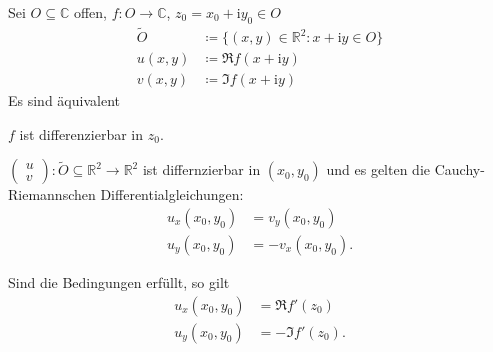 \begin{theorem}[Satz] \label{thm:2.20}
  Sei $O \subseteq \mathbb{C}$ offen, $f : O \to \mathbb{C}$, $z_0 = x_0 + \mathrm{i} y_0 \in O$
  \begin{align*}
    \widetilde{O} &\coloneq \{(x,y) \in \mathbb{R}^2 : x + \mathrm{i} y \in O\} \\
    u(x,y) &\coloneq \Re f(x + \mathrm{i} y) \\
    v(x,y) &\coloneq \Im f(x + \mathrm{i} y)
  \end{align*}
  Es sind äquivalent
  \begin{enum-roman}
    \item \label{itm:2.20 i} $f$ ist differenzierbar in $z_0$.
    
    \item \label{itm:2.20 ii} $\begin{pmatrix} u \\ v \end{pmatrix} : \widetilde{O} \subseteq \mathbb{R}^2 \to \mathbb{R}^2$ ist differnzierbar in $(x_0,y_0)$ und es gelten die Cauchy-Riemannschen Differentialgleichungen:
    \begin{align*}
      u_x(x_0,y_0) &= v_y(x_0,y_0) \\
      u_y(x_0,y_0) &= -v_x(x_0,y_0) .
    \end{align*}
  \end{enum-roman}
  Sind die Bedingungen erfüllt, so gilt
  \begin{align*}
    u_x(x_0,y_0) &= \Re f'(z_0) \\
    u_y(x_0,y_0) &= - \Im f'(z_0).
  \end{align*}
  

\end{theorem}
